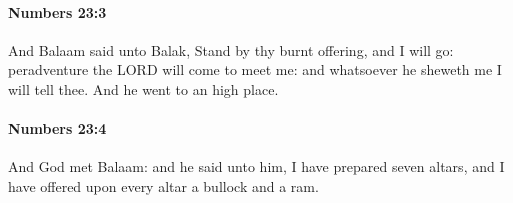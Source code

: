 		\paragraph{Numbers 23:3} %
			\label{NUMBERS-23-3}

			And Balaam said unto Balak, Stand by thy burnt offering, and I will go: peradventure the LORD will come to meet me: and whatsoever he sheweth me I will tell thee. And he went to an high place.


		\paragraph{Numbers 23:4} %
			\label{NUMBERS-23-4}

			And God met Balaam: and he said unto him, I have prepared seven altars, and I have offered upon every altar a bullock and a ram.


